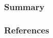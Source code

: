 \documentclass[
    11pt,
]{beamer}
\begin{document}

\begin{frame}
    \frametitle{Summary}
    \tableofcontents
\end{frame}







\begin{frame}[allowframebreaks]

\frametitle{References}

\printbibliography

\end{frame}
\end{document}
